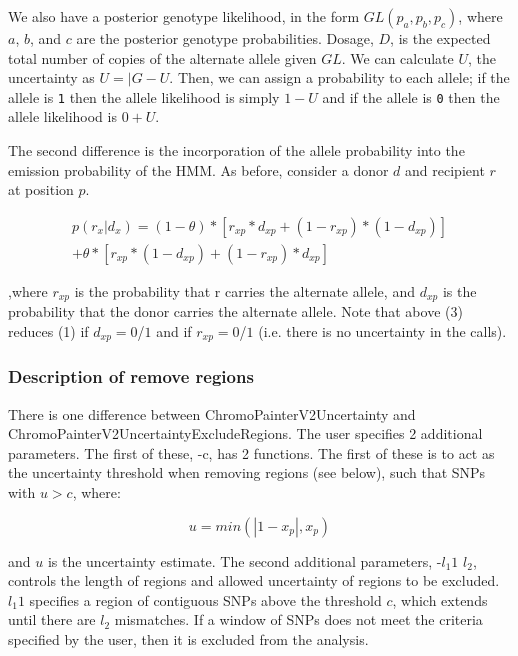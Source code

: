 We also have a posterior genotype likelihood, in the form $GL(p_{a}, p_{b}, p_{c})$, where $a$, $b$, and $c$ are the posterior genotype probabilities. Dosage, $D$, is the expected total number of copies of the alternate allele given $GL$. We can calculate $U$, the uncertainty as $U = |G-U$. Then, we can assign a probability to each allele; if the allele is \texttt{1} then the allele likelihood is simply $1 - U$ and if the allele is \texttt{0} then the allele likelihood is $0 + U$.
                 
The second difference is the incorporation of the allele probability into the emission probability of the HMM. As before, consider a donor $d$ and recipient $r$ at position $p$.

\begin{equation}
\begin{split}
p(r_{x} | d_{x}) = (1-\theta)*[r_{xp}*d_{xp} + (1-r_{xp}) * (1-d_{xp})] \\ + \theta * [r_{xp}*(1-d_{xp}) + (1-r_{xp})*d_{xp}]
\end{split}
\end{equation}

,where  $r_{xp}$ is the probability that r carries the alternate allele, and $d_{xp}$ is the probability that the donor carries the alternate allele. Note that above (3) reduces (1) if $d_{xp} = 0$/$1$ and if $r_{xp} = 0$/$1$ (i.e. there is no uncertainty in the calls).

\subsubsection{Description of remove regions}

There is one difference between ChromoPainterV2Uncertainty and ChromoPainterV2UncertaintyExcludeRegions. The user specifies 2 additional parameters. The first of these, -c, has 2 functions. The first of these is to act as the uncertainty threshold when removing regions (see below), such that SNPs with $u> c$, where:

\begin{equation}
u = min(|1-x_{p}| , x_{p})
\end{equation}

and $u$ is the uncertainty estimate. The second additional parameters, -$l_{1}1$ $l_{2}$, controls the length of regions and allowed uncertainty of regions to be excluded. $l_{1}1$ specifies a region of contiguous SNPs above the threshold $c$, which extends until there are  $l_{2}$ mismatches. If a window of SNPs does not meet the criteria specified by the user, then it is excluded from the analysis. 

